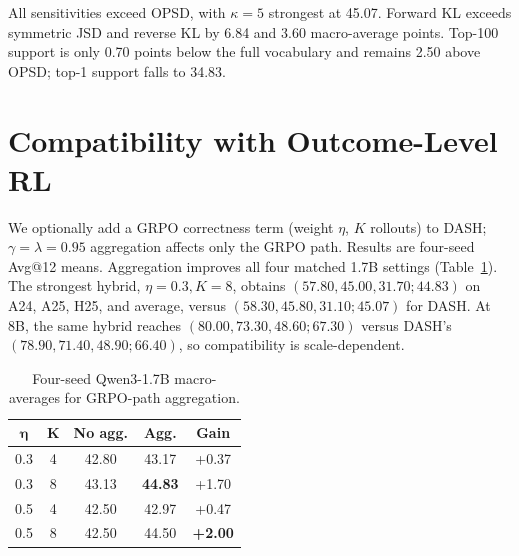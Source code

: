 \documentclass[letterpaper]{article} %
\begin{document}
All sensitivities exceed OPSD, with \(\kappa=5\) strongest at 45.07.
Forward KL exceeds symmetric JSD and reverse KL by 6.84 and 3.60
macro-average points. Top-100 support is only 0.70 points below the full
vocabulary and remains 2.50 above OPSD; top-1 support falls to 34.83.

\section{Compatibility with Outcome-Level RL}
\label{sec:outcome_optimization}

We optionally add a GRPO correctness term (weight \(\eta\), \(K\)
rollouts) to DASH; \(\gamma=\lambda=0.95\) aggregation affects only the
GRPO path. Results are four-seed Avg@12 means. Aggregation improves all
four matched 1.7B settings (Table~\ref{tab:supp_grpo_grid}). The strongest
hybrid, \(\eta=0.3,K=8\), obtains
$(57.80,45.00,31.70;44.83)$ on A24, A25, H25, and average, versus
$(58.30,45.80,31.10;45.07)$ for DASH. At 8B, the same hybrid reaches
$(80.00,73.30,48.60;67.30)$ versus DASH's
$(78.90,71.40,48.90;66.40)$, so compatibility is scale-dependent.

\begin{table}[!htbp]
\centering
\scriptsize
\setlength{\tabcolsep}{5pt}
\begin{tabular}{@{}ccccc@{}}
\toprule
\(\boldsymbol{\eta}\) & \(\boldsymbol{K}\) & \textbf{No agg.} & \textbf{Agg.} & \textbf{Gain} \\
\midrule
0.3 & 4 & 42.80 & 43.17 & +0.37 \\
0.3 & 8 & 43.13 & \textbf{44.83} & +1.70 \\
0.5 & 4 & 42.50 & 42.97 & +0.47 \\
0.5 & 8 & 42.50 & 44.50 & \textbf{+2.00} \\
\bottomrule
\end{tabular}
\caption{Four-seed Qwen3-1.7B macro-averages for GRPO-path aggregation.}
\label{tab:supp_outcome_combined}
\label{tab:supp_grpo_grid}
\end{table}
\end{document}
